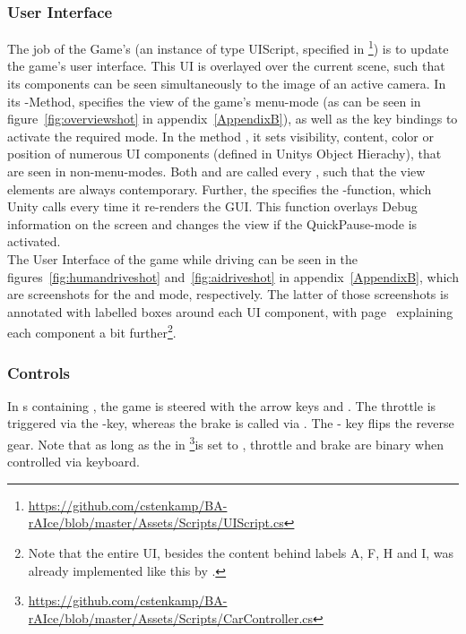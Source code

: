\subsubsection{User Interface}

The job of the Game's  (an instance of type UIScript, specified in \mbox{\footnote{\url{https://github.com/cstenkamp/BA-rAIce/blob/master/Assets/Scripts/UIScript.cs}}\byLeon)} is to update the game's user interface. This UI is overlayed over the current scene, such that its components can be seen simultaneously to the image of an active camera. In its -Method,  specifies the view of the game's menu-mode (as can be seen in figure~\ref{fig:overviewshot} in appendix~\ref{AppendixB}), as well as the key bindings to activate the required mode. In the method , it sets visibility, content, color or position of numerous UI components (defined in Unitys Object Hierachy), that are seen in non-menu-modes. Both  and  are called every , such that the view elements are always contemporary. Further, the  specifies the -function, which Unity calls every time it re-renders the GUI. This function overlays Debug information on the screen and changes the view if the QuickPause-mode is activated.\\

\noindent The User Interface of the game while driving can be seen in the figures~\ref{fig:humandriveshot} and~\ref{fig:aidriveshot} in appendix~\ref{AppendixB}, which are screenshots for the  and  mode, respectively. The latter of those screenshots is annotated with labelled boxes around each UI component, with page~\pageref{fig:aidriveshot} explaining each component a bit further\footnote{Note that the entire UI, besides the content behind labels A, F, H and I, was already implemented like this by \leon.}.

\subsubsection{Controls}

In s containing , the game is steered with the arrow keys \keystroke{$\leftarrow$} and \mbox{\keystroke{$\rightarrow$}.} The throttle is triggered via the -key, whereas the brake is called via . The  - key flips the reverse gear. Note that as long as the  in \footnote{\url{https://github.com/cstenkamp/BA-rAIce/blob/master/Assets/Scripts/CarController.cs}}\byLeon is set to , throttle and brake are binary when controlled via keyboard. 

